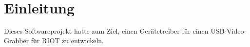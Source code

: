 \section{Einleitung}
Dieses Softwareprojekt hatte zum Ziel, einen Gerätetreiber für einen USB-Video-Grabber für RIOT zu entwickeln.